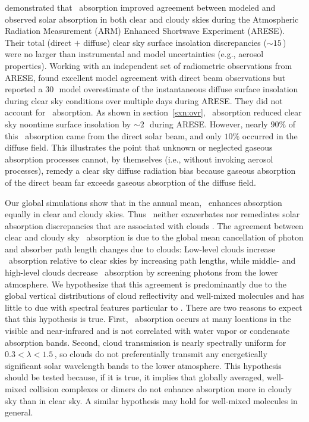 \documentclass[agupp,twoside]{aguplus} %
\begin{document}
\cite{ZBP97} demonstrated that \OdOd\ absorption improved agreement
between modeled and observed solar absorption in both clear and cloudy
skies during the Atmospheric Radiation Measurement (ARM) Enhanced
Shortwave Experiment (ARESE). 
Their total (direct $+$ diffuse) clear sky surface insolation
discrepancies ($\sim 15$\,\wxmS) were no larger than instrumental and
model uncertainties (e.g., aerosol properties). 
Working with an independent set of radiometric observations from
ARESE, \cite{KAC97} found excellent model agreement with direct beam
observations but reported a 30\,\wxmS\ model overestimate of the
instantaneous diffuse surface insolation during clear sky conditions
over multiple days during ARESE. 
They did not account for \OdX\ absorption.
As shown in section~\ref{sxn:ovr}, \OdX\ absorption reduced clear sky
noontime surface insolation by $\sim 2$\,\wxmS\ during ARESE. 
However, nearly $90\%$ of this \OdX\ absorption came from the direct
solar beam, and only $10\%$ occurred in the diffuse field.  
This illustrates the point that unknown or neglected gaseous
absorption processes cannot, by themselves (i.e., without invoking
aerosol processes), remedy a clear sky diffuse radiation bias because
gaseous absorption of the direct beam far exceeds gaseous absorption
of the diffuse field. 

Our global simulations show that in the annual mean, \OdX\ enhances
absorption equally in clear and cloudy skies. 
Thus \OdX\ neither exacerbates nor remediates solar absorption
discrepancies that are associated with clouds
\cite[]{StT902,CZM95,RaV97}.  
The agreement between clear and cloudy sky \OdX\ absorption is due to
the global mean cancellation of photon and absorber path length
changes due to clouds: 
Low-level clouds increase \OdX\ absorption relative to clear skies by
increasing path lengths, while middle- and high-level clouds decrease
\OdX\ absorption by screening photons from the lower atmosphere. 
We hypothesize that this agreement is predominantly due to the global
vertical distributions of cloud reflectivity and well-mixed molecules
and has little to due with spectral features particular to \OdX.   
There are two reasons to expect that this hypothesis is true.
First, \OdX\ absorption occurs at many locations in the visible and
near-infrared and is not correlated with water vapor or condensate
absorption bands.
Second, cloud transmission is nearly spectrally uniform for $0.3 <
\lambda < 1.5$\,\um, so clouds do not preferentially transmit any
energetically significant solar wavelength bands to the lower
atmosphere. 
This hypothesis should be tested because, if it is true, it implies
that globally averaged, well-mixed collision complexes or dimers
do not enhance absorption more in cloudy sky than in clear sky.  
A similar hypothesis may hold for well-mixed molecules in general. 
\end{document}
